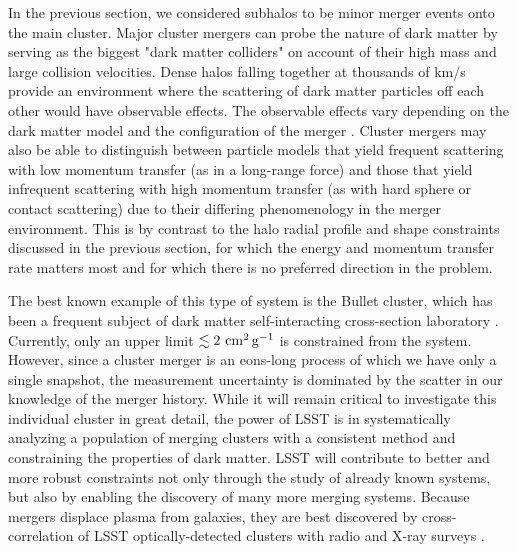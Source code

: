 In the previous section, we considered subhalos to be minor merger events onto the main cluster.  Major cluster mergers can probe the nature of dark matter by serving as the biggest "dark matter colliders" on account of their high mass and large collision velocities. Dense halos falling together at thousands of km/s provide an environment where the scattering of dark matter particles off each other would have observable effects.  The observable effects vary depending on the dark matter model and the configuration of the merger \citep{Kim:2016ujt}.  %
Cluster mergers may also be able to distinguish between particle models that yield frequent scattering with low momentum transfer (as in a long-range force) and those that yield infrequent scattering with high momentum transfer (as with hard sphere or contact scattering) due to their differing phenomenology in the merger environment.  This is by contrast to the halo radial profile and shape constraints discussed in the previous section, for which the energy and momentum transfer rate matters most and for which there is no preferred direction in the problem.

The best known example of this type of system is the Bullet cluster, which has been a frequent subject of dark matter self-interacting cross-section laboratory \citep{Randall:2007ph,2017MNRAS.465..569R}. Currently, only an upper limit  $\lesssim 2 \mathrm{\,\mathrm{\,cm}^2\mathrm{\,g}^{-1}}$ is constrained from the system.
However, since a cluster merger is an eons-long process of which we have only a single snapshot, the measurement uncertainty is dominated by the scatter in our knowledge of the merger history. While it will remain critical to investigate this individual cluster in great detail, the power of LSST is in systematically analyzing a population of merging clusters with a consistent method and constraining the properties of dark matter.
LSST will contribute to better and more robust constraints not only through the study of already known systems, but also by enabling the discovery of many more merging systems. Because mergers displace plasma from galaxies, they are best discovered by cross-correlation of LSST optically-detected clusters with radio and X-ray surveys \citep{Golovich:2018,Wilber2018}.


